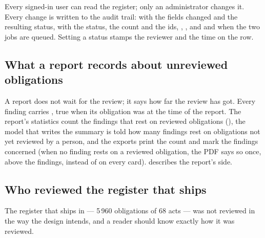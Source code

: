 Every signed-in user can read the register; only an administrator changes it. Every change
is written to the audit trail:  with the fields changed and the
resulting status,  with the status, the count and the ids,
, , and  and
 when the two jobs are queued. Setting a status stamps the reviewer
and the time on the row.

\subsection{What a report records about unreviewed obligations}

A report does not wait for the review; it says how far the review has got. Every finding
carries , true when its obligation was  at the time
of the report. The report's statistics count the findings that rest on reviewed obligations
(), the model that writes the summary is told how many findings
rest on obligations not yet reviewed by a person, and the exports print the count and mark
the findings concerned (when no finding rests on a reviewed obligation, the PDF says so once,
above the findings, instead of on every card).  describes the report's side.

\subsection{Who reviewed the register that ships}\label{sec:obligations:shipped}

The register that ships in  --- 5\,960 obligations of 68
acts --- was not reviewed in the way the design intends, and a reader should know exactly
how it was reviewed.

